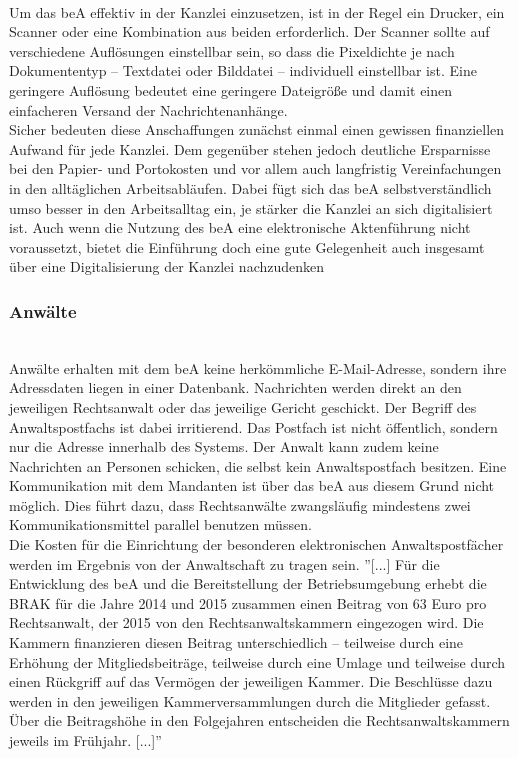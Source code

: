 \\
Um das beA effektiv in der Kanzlei einzusetzen, ist in der Regel ein Drucker, ein Scanner oder eine Kombination aus beiden erforderlich. Der Scanner sollte auf verschiedene Auflösungen einstellbar sein, so dass die Pixeldichte je nach Dokumententyp – Textdatei oder Bilddatei – individuell einstellbar ist. Eine geringere Auflösung bedeutet eine geringere Dateigröße und damit einen einfacheren Versand der Nachrichtenanhänge. \\
Sicher bedeuten diese Anschaffungen zunächst einmal einen gewissen finanziellen Aufwand für jede Kanzlei. Dem gegenüber stehen jedoch deutliche Ersparnisse bei den Papier- und Portokosten und vor allem auch langfristig Vereinfachungen in den alltäglichen Arbeitsabläufen. Dabei fügt sich das beA selbstverständlich umso besser in den Arbeitsalltag ein, je stärker die Kanzlei an sich digitalisiert ist. Auch wenn die Nutzung des beA eine elektronische Aktenführung nicht voraussetzt, bietet die Einführung doch eine gute Gelegenheit auch insgesamt über eine Digitalisierung der Kanzlei nachzudenken

\subsubsection{Anwälte}\hspace*{\fill} \\
Anwälte erhalten mit dem beA keine herkömmliche E-Mail-Adresse, sondern ihre Adressdaten liegen in einer Datenbank. Nachrichten werden direkt an den jeweiligen Rechtsanwalt oder das jeweilige Gericht geschickt.
Der Begriff des Anwaltspostfachs ist dabei irritierend. Das Postfach ist nicht öffentlich, sondern nur die Adresse innerhalb des Systems. Der Anwalt kann zudem keine Nachrichten an Personen schicken, die selbst kein Anwaltspostfach besitzen. Eine Kommunikation mit dem Mandanten ist über das beA aus diesem Grund nicht möglich. Dies führt dazu, dass Rechtsanwälte zwangsläufig mindestens zwei Kommunikationsmittel parallel benutzen müssen. \\
Die Kosten für die Einrichtung der besonderen elektronischen Anwaltspostfächer werden im Ergebnis von der Anwaltschaft zu tragen sein. ''[...] Für die Entwicklung des beA und die Bereitstellung der Betriebsumgebung erhebt die BRAK für die Jahre 2014 und 2015 zusammen einen Beitrag von 63 Euro pro Rechtsanwalt, der 2015 von den Rechtsanwaltskammern eingezogen wird. Die Kammern finanzieren diesen Beitrag unterschiedlich – teilweise durch eine Erhöhung der Mitgliedsbeiträge, teilweise durch eine Umlage und teilweise durch einen Rückgriff auf das Vermögen der jeweiligen Kammer. Die Beschlüsse dazu werden in den jeweiligen Kammerversammlungen durch die Mitglieder gefasst. Über die Beitragshöhe in den Folgejahren entscheiden die Rechtsanwaltskammern jeweils im Frühjahr. [...]'' \cite{bea:bea:brak}

